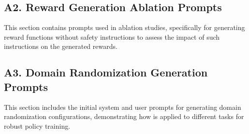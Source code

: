 \documentclass[conference]{IEEEtran}
\begin{document}


\subsection*{A2. Reward Generation Ablation Prompts}
This section contains prompts used in ablation studies, specifically for generating reward functions without safety instructions to assess the impact of such instructions on the generated rewards.


\subsection*{A3. Domain Randomization Generation Prompts}
This section includes the initial system and user prompts for generating domain randomization configurations, demonstrating how \ourmethod is applied to different tasks for robust policy training.







\end{document}
